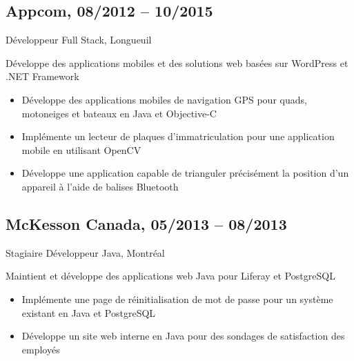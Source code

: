 \documentclass{article}
\begin{document}
\begin{paracol}{2}
\begin{rightcolumn}
    \vspace{1em}  

    \subsection{Appcom, 08/2012 -- 10/2015}  
    {Développeur Full Stack, Longueuil\par}  
    {  
      Développe des applications mobiles et des solutions web basées sur WordPress et .NET Framework
    \par}  
    \begin{itemize}  
      \item Développe des applications mobiles de navigation GPS pour quads, motoneiges et bateaux en Java et Objective-C  
      \item Implémente un lecteur de plaques d’immatriculation pour une application mobile en utilisant OpenCV  
      \item Développe une application capable de trianguler précisément la position d’un appareil à l’aide de balises Bluetooth  
    \end{itemize}  

    \vspace{1em}  

    \subsection{McKesson Canada, 05/2013 -- 08/2013}  
    {Stagiaire Développeur Java, Montréal\par}  
    {  
      Maintient et développe des applications web Java pour Liferay et PostgreSQL  
    \par}  
    \begin{itemize}  
      \item Implémente une page de réinitialisation de mot de passe pour un système existant en Java et PostgreSQL  
      \item Développe un site web interne en Java pour des sondages de satisfaction des employés  
    \end{itemize}  
    
    \flushpage

  \end{rightcolumn}
\end{paracol}
\end{document}
